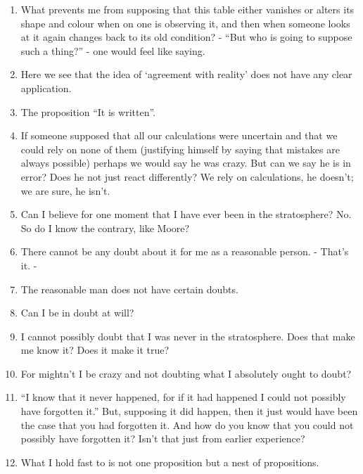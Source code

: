 \documentclass{book}
\begin{document}
\begin{enumerate}
\item
What prevents me from supposing that this table either vanishes or alters its
shape and colour when on one is observing it, and then when someone looks at it
again changes back to its old condition? - ``But who is going to suppose such a
thing?'' - one would feel like saying.

\item
Here we see that the idea of `agreement with reality' does not have any clear
application.

\item
The proposition ``It is written''.

\item
If someone supposed that all our calculations were uncertain and that we could
rely on none of them (justifying himself by saying that mistakes are always
possible) perhaps we would say he was crazy. But can we say he is in error?
Does he not just react differently? We rely on calculations, he doesn't; we are
sure, he isn't.

\item
Can I believe for one moment that I have ever been in the stratosphere? No. So
do I know the contrary, like Moore?

\item
There cannot be any doubt about it for me as a reasonable person. - That's it.
-

\item
The reasonable man does not have certain doubts.

\item
Can I be in doubt at will?

\item
I cannot possibly doubt that I was never in the stratosphere. Does that make me
know it? Does it make it true?

\item
For mightn't I be crazy and not doubting what I absolutely ought to doubt?

\item
``I know that it never happened, for if it had happened I could not possibly
have forgotten it.'' But, supposing it did happen, then it just would have been
the case that you had forgotten it. And how do you know that you could not
possibly have forgotten it? Isn't that just from earlier experience?

\item
What I hold fast to is not one proposition but a nest of propositions.


\end{enumerate}
\end{document}
